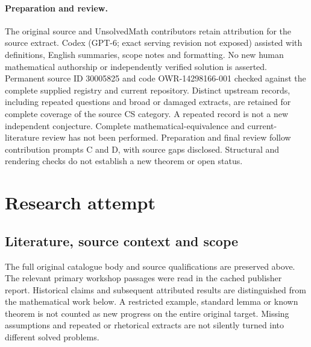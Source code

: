 \documentclass[11pt]{article}
\begin{document}
\paragraph{Preparation and review.}
The original source and UnsolvedMath contributors retain attribution for the source extract. Codex (GPT-6; exact serving revision not exposed) assisted with definitions, English summaries, scope notes and formatting. No new human mathematical authorship or independently verified solution is asserted. Permanent source ID 30005825 and code OWR-14298166-001 checked against the complete supplied registry and current repository. Distinct upstream records, including repeated questions and broad or damaged extracts, are retained for complete coverage of the source CS category. A repeated record is not a new independent conjecture. Complete mathematical-equivalence and current-literature review has not been performed. Preparation and final review follow contribution prompts C and D, with source gaps disclosed. Structural and rendering checks do not establish a new theorem or open status.
\label{end:30005825}

\section{Research attempt}
\subsection{Literature, source context and scope}
The full original catalogue body and source qualifications are preserved above. The relevant primary workshop passages were read in the cached publisher report. Historical claims and subsequent attributed results are distinguished from the mathematical work below. A restricted example, standard lemma or known theorem is not counted as new progress on the entire original target. Missing assumptions and repeated or rhetorical extracts are not silently turned into different solved problems.
\end{document}
